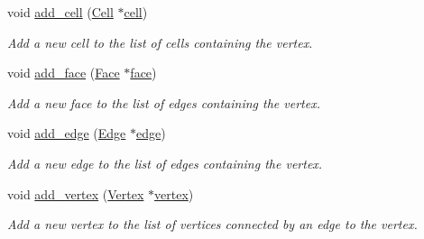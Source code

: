 \begin{DoxyCompactItemize}
void \hyperlink{classHArDCore3D_1_1Vertex_a133647cd83e7d3b92a9ac55fe5878808}{add\+\_\+cell} (\hyperlink{classHArDCore3D_1_1Cell}{Cell} $\ast$\hyperlink{classHArDCore3D_1_1Vertex_a5054b903ff91506cc7d75afa44fd864b}{cell})
\begin{DoxyCompactList}\small\item\em Add a new cell to the list of cells containing the vertex. \end{DoxyCompactList}\item 
\mbox{\label{classHArDCore3D_1_1Vertex_a2c502ea7f0f94c387af9aed652ce3ad4}} 
void \hyperlink{classHArDCore3D_1_1Vertex_a2c502ea7f0f94c387af9aed652ce3ad4}{add\+\_\+face} (\hyperlink{classHArDCore3D_1_1Face}{Face} $\ast$\hyperlink{classHArDCore3D_1_1Vertex_ab54bfabab19328bcbb6b8e218bc3a3a8}{face})
\begin{DoxyCompactList}\small\item\em Add a new face to the list of edges containing the vertex. \end{DoxyCompactList}\item 
\mbox{\label{classHArDCore3D_1_1Vertex_abc7880abdf7299a56b38b1cb2302ed19}} 
void \hyperlink{classHArDCore3D_1_1Vertex_abc7880abdf7299a56b38b1cb2302ed19}{add\+\_\+edge} (\hyperlink{classHArDCore3D_1_1Edge}{Edge} $\ast$\hyperlink{classHArDCore3D_1_1Vertex_a782d7982e24169c50ea4631ffd3d9b55}{edge})
\begin{DoxyCompactList}\small\item\em Add a new edge to the list of edges containing the vertex. \end{DoxyCompactList}\item 
\mbox{\label{classHArDCore3D_1_1Vertex_aeffe35d0d60a1ee284f645a5642ff75c}} 
void \hyperlink{classHArDCore3D_1_1Vertex_aeffe35d0d60a1ee284f645a5642ff75c}{add\+\_\+vertex} (\hyperlink{classHArDCore3D_1_1Vertex}{Vertex} $\ast$\hyperlink{classHArDCore3D_1_1Vertex_ae4d861f137a630bb3fde25acf03198ed}{vertex})
\begin{DoxyCompactList}\small\item\em Add a new vertex to the list of vertices connected by an edge to the vertex. \end{DoxyCompactList}\item 
\mbox{\label{classHArDCore3D_1_1Vertex_a72fa3131022cb2c847a2e9d5b56cb893}} 

\end{DoxyCompactItemize}
